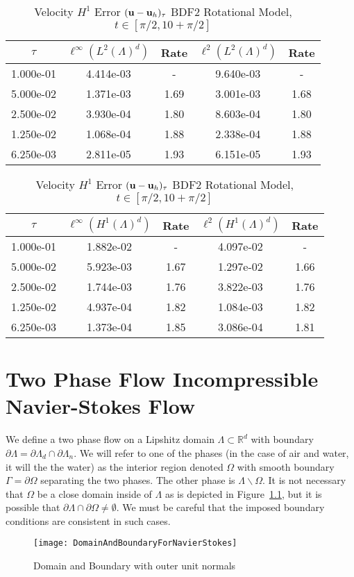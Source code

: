 \documentclass[letterpaper]{erdc}
\begin{document}
\begin{table}[h!]
  \parbox{.45\linewidth}{
  \tiny
  \centering
    \caption{Velocity $L^2$ Error $(\textbf{u} - \textbf{u}_h)_{\tau}$ BDF2 Rotational Model, $t\in[\pi/2, 10+\pi/2]$}
    \begin{tabular}{c|c|c|c|c}
      $\tau$ &  $\ell^{\infty}\left(L^2(\Lambda)^d\right)$ &  Rate  &  $\ell^2\left(L^2(\Lambda)^d\right)$  &  Rate\\
      \hline
      1.000e-01 & 4.414e-03 &  -   & 9.640e-03 &  -  \\
      5.000e-02 & 1.371e-03 & 1.69 & 3.001e-03 & 1.68\\
      2.500e-02 & 3.930e-04 & 1.80 & 8.603e-04 & 1.80\\
      1.250e-02 & 1.068e-04 & 1.88 & 2.338e-04 & 1.88\\
      6.250e-03 & 2.811e-05 & 1.93 & 6.151e-05 & 1.93
    \end{tabular}
    }
    \hfill
    \parbox{.45\linewidth}{
    \tiny
    \centering
      \caption{Velocity $H^1$ Error $(\textbf{u} - \textbf{u}_h)_{\tau}$ BDF2 Rotational Model, $t\in[\pi/2, 10+\pi/2]$}
      \begin{tabular}{c|c|c|c|c}\label{table:lastconvergenceresult}
        $\tau$ &  $\ell^{\infty}\left(H^1(\Lambda)^d\right)$ &  Rate  &  $\ell^2\left(H^1(\Lambda)^d\right)$  &  Rate\\
        \hline
        1.000e-01 & 1.882e-02 &  -   & 4.097e-02 &  -  \\
        5.000e-02 & 5.923e-03 & 1.67 & 1.297e-02 & 1.66\\
        2.500e-02 & 1.744e-03 & 1.76 & 3.822e-03 & 1.76\\
        1.250e-02 & 4.937e-04 & 1.82 & 1.084e-03 & 1.82\\
        6.250e-03 & 1.373e-04 & 1.85 & 3.086e-04 & 1.81
      \end{tabular}
    }
\end{table}


%
%
%
%
\chapter{Two Phase Flow Incompressible Navier-Stokes Flow}\label{ch:2PFlow}

We define a two phase flow on a Lipshitz domain $\Lambda\subset\mathbb{R}^d$ with boundary $\partial\Lambda = \partial\Lambda_{d}\cap\partial\Lambda_{n}$.  We will refer to one of the phases (in the case of air and water, it will the the water) as the interior region denoted $\Omega$ with smooth boundary $\Gamma = \partial\Omega$ separating the two phases.  The other phase is $\Lambda\backslash\Omega$.  It is not necessary that $\Omega$ be a close domain inside of $\Lambda$ as is depicted in Figure~\ref{fig:DomainAndBoundary}, but it is possible that $\partial\Lambda\cap \partial\Omega \neq \emptyset$.  We must be careful that the imposed boundary conditions are consistent in such cases.
\begin{figure}[h!]
  \centering
    \texttt{[image: DomainAndBoundaryForNavierStokes]}
  \caption{Domain and Boundary with outer unit normals}
  \label{fig:DomainAndBoundary}
\end{figure}
\end{document}
